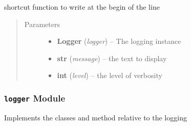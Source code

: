 \documentclass[a4paper,10pt,english]{sphinxmanual}
\begin{document}

\begin{fulllineitems}
\label{commands/apidoc/src:src.fork.write_back}
shortcut function to write at the begin of the line
\begin{quote}\begin{description}
\item[{Parameters}] \leavevmode\begin{itemize}
\item {} 
\textbf{Logger} (\emph{logger}) -- The logging instance

\item {} 
\textbf{str} (\emph{message}) -- the text to display

\item {} 
\textbf{int} (\emph{level}) -- the level of verbosity

\end{itemize}

\end{description}\end{quote}

\end{fulllineitems}



\subsubsection{\texttt{logger} Module}
\label{commands/apidoc/src:logger-module}\label{commands/apidoc/src:module-src.logger}
Implements the classes and method relative to the logging
\end{document}
